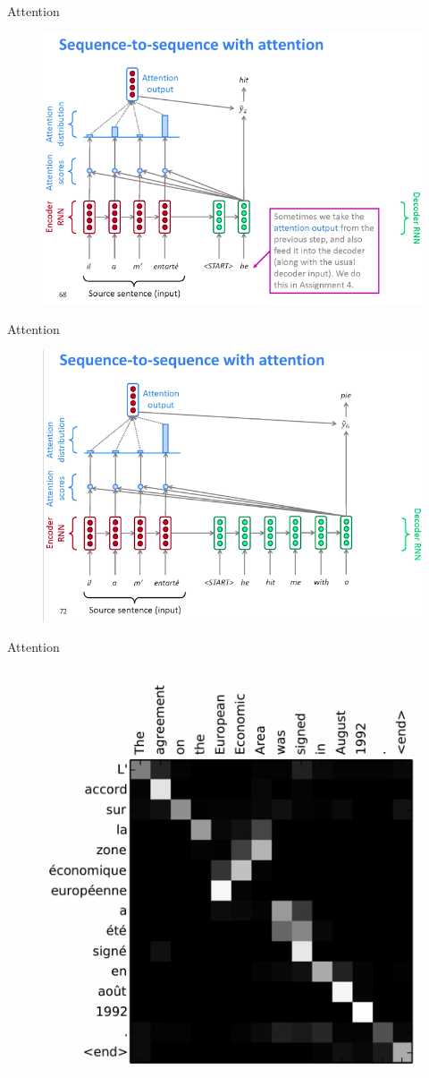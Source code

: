 \documentclass[notes,12pt, aspectratio=169]{beamer}
\begin{document}
\begin{frame}{Attention}

\begin{figure}
	\centering
	\includegraphics[width=0.7\linewidth]{images/attention_2}
	\label{fig:seq2seq}
\end{figure}
\end{frame}

\begin{frame}{Attention}

\begin{figure}
	\centering
	\includegraphics[width=0.7\linewidth]{images/attention_3}
	\label{fig:seq2seq}
\end{figure}
\end{frame}

\begin{frame}{Attention}

\begin{figure}
	\centering
	\includegraphics[width=0.5\linewidth]{images/undestend_attention}
	\label{fig:seq2seq}
\end{figure}
\end{frame}
\end{document}
